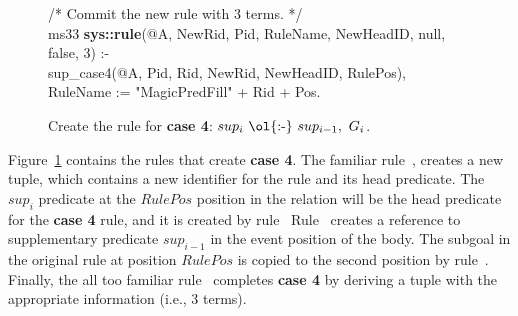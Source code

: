\begin{figure}[!t]
\begin{boxedminipage}{\linewidth}
/* Commit the new rule with $3$ terms. */ \\
ms33 {\bf sys::rule}(@A, NewRid, Pid, RuleName, NewHeadID, null, false, 3) :- \\
\datalogspace sup\_case4(@A, Pid, Rid, NewRid, NewHeadID, RulePos), \\
\datalogspace RuleName := "MagicPredFill" + Rid + Pos.

\end{boxedminipage}
\caption{\label{ch:magic:fig:rewrite7} 
Create the rule for {\bf case 4}: $sup_i\ \text{\ol{:-}}\ sup_{i-1},\ G_i$. } 
\end{figure}

Figure~\ref{ch:magic:fig:rewrite7} contains the rules that create {\bf case 4}.
The familiar rule~, creates a new  tuple, which
contains a new identifier for the rule and its head predicate.  The $sup_i$
predicate at the $RulePos$ position in the  relation will be the head
predicate for the {\bf case 4} rule, and it is created by rule~
Rule~ creates a reference to supplementary predicate $sup_{i-1}$ in
the event position of the body.  The subgoal in the original rule at position
$RulePos$ is copied to the second position by rule~.  Finally, the all
too familiar rule~ completes {\bf case 4} by deriving a 
tuple with the appropriate information (i.e., $3$ terms).


